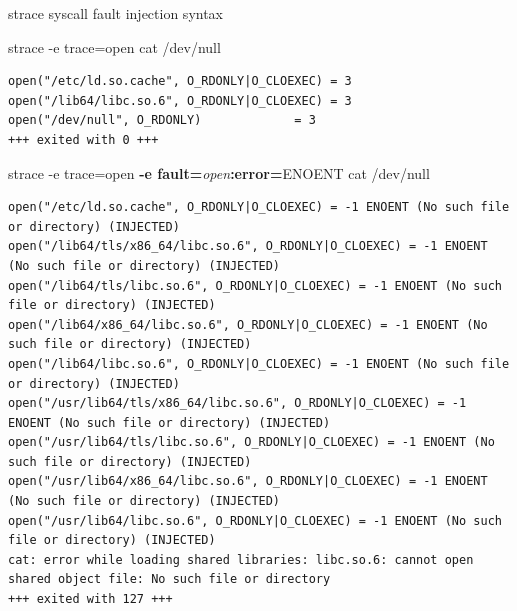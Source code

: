 \documentclass[unicode,aspectratio=169]{beamer}
\begin{document}
\begin{frame}[fragile]{strace syscall fault injection syntax}
\scriptsize
\begin{block}{\large strace -e trace=open cat /dev/null}
\begin{verbatim}
open("/etc/ld.so.cache", O_RDONLY|O_CLOEXEC) = 3
open("/lib64/libc.so.6", O_RDONLY|O_CLOEXEC) = 3
open("/dev/null", O_RDONLY)             = 3
+++ exited with 0 +++
\end{verbatim}
\end{block}
\begin{block}{\large strace -e trace=open {\bf -e fault=}{\it open}{\bf :error=}{\sc ENOENT} cat /dev/null}
\begin{verbatim}
open("/etc/ld.so.cache", O_RDONLY|O_CLOEXEC) = -1 ENOENT (No such file or directory) (INJECTED)
open("/lib64/tls/x86_64/libc.so.6", O_RDONLY|O_CLOEXEC) = -1 ENOENT (No such file or directory) (INJECTED)
open("/lib64/tls/libc.so.6", O_RDONLY|O_CLOEXEC) = -1 ENOENT (No such file or directory) (INJECTED)
open("/lib64/x86_64/libc.so.6", O_RDONLY|O_CLOEXEC) = -1 ENOENT (No such file or directory) (INJECTED)
open("/lib64/libc.so.6", O_RDONLY|O_CLOEXEC) = -1 ENOENT (No such file or directory) (INJECTED)
open("/usr/lib64/tls/x86_64/libc.so.6", O_RDONLY|O_CLOEXEC) = -1 ENOENT (No such file or directory) (INJECTED)
open("/usr/lib64/tls/libc.so.6", O_RDONLY|O_CLOEXEC) = -1 ENOENT (No such file or directory) (INJECTED)
open("/usr/lib64/x86_64/libc.so.6", O_RDONLY|O_CLOEXEC) = -1 ENOENT (No such file or directory) (INJECTED)
open("/usr/lib64/libc.so.6", O_RDONLY|O_CLOEXEC) = -1 ENOENT (No such file or directory) (INJECTED)
cat: error while loading shared libraries: libc.so.6: cannot open shared object file: No such file or directory
+++ exited with 127 +++
\end{verbatim}
\end{block}
\end{frame}
\end{document}

